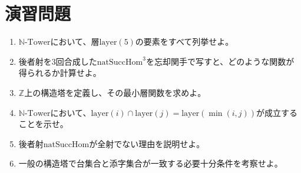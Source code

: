 \documentclass[a4paper,12pt]{article}
\theoremstyle{definition}
\begin{document}
\section{演習問題}

\begin{enumerate}
\item $\mathbb{N}\text{-Tower}$において、層$\text{layer}(5)$の要素をすべて列挙せよ。

\item 後者射を3回合成した$\text{natSuccHom}^3$を忘却関手で写すと、どのような関数が得られるか計算せよ。

\item $\mathbb{Z}$上の構造塔を定義し、その最小層関数を求めよ。

\item $\mathbb{N}\text{-Tower}$において、$\text{layer}(i) \cap \text{layer}(j) = \text{layer}(\min(i, j))$が成立することを示せ。

\item 後者射$\text{natSuccHom}$が全射でない理由を説明せよ。

\item 一般の構造塔で台集合と添字集合が一致する必要十分条件を考察せよ。
\end{enumerate}
\end{document}
